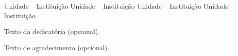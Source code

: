 
\frontmatter %



\capa
\folhaderosto


%

\fichacatalografica{}



\begin{folhadeaprovacao}
             {Unidade -- Instituição}
             {Unidade -- Instituição}
             {Unidade -- Instituição}
             {Unidade -- Instituição}
\end{folhadeaprovacao}



\vfill
Texto da dedicatória (opcional).




Texto de agradecimento (opcional).



